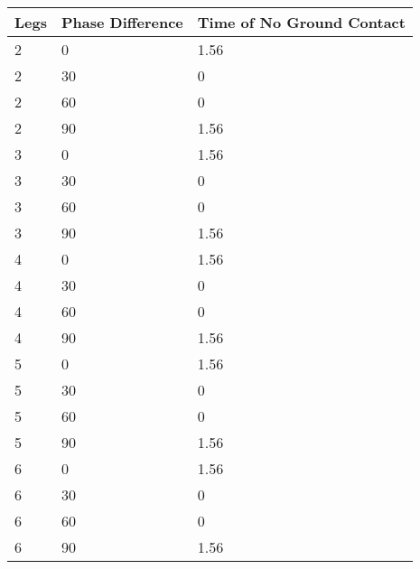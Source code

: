 \begin{tabular}{lll}
Legs & Phase Difference & Time of No Ground Contact \\ 
\hline 
2 & 0 & 1.56 \\ 
2 & 30 & 0 \\ 
2 & 60 & 0 \\ 
2 & 90 & 1.56 \\ 
3 & 0 & 1.56 \\ 
3 & 30 & 0 \\ 
3 & 60 & 0 \\ 
3 & 90 & 1.56 \\ 
4 & 0 & 1.56 \\ 
4 & 30 & 0 \\ 
4 & 60 & 0 \\ 
4 & 90 & 1.56 \\ 
5 & 0 & 1.56 \\ 
5 & 30 & 0 \\ 
5 & 60 & 0 \\ 
5 & 90 & 1.56 \\ 
6 & 0 & 1.56 \\ 
6 & 30 & 0 \\ 
6 & 60 & 0 \\ 
6 & 90 & 1.56 \\ 
\hline 
\end{tabular}